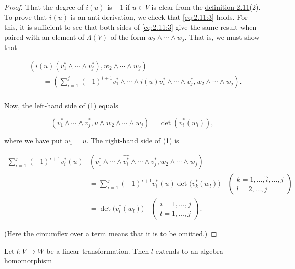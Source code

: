 \begin{proof}
That the degree of $i(u)$ is $-1$ if $u \in V$ is clear from the \hyperref[thm:2.11]{definition 2.11}(2). To prove that $i(u)$ is an anti-derivation, we check that \eqref{eq:2.11:3} holds. For this, it is sufficient to see that both sides of \eqref{eq:2.11:3} give the same result when paired with an element of $\Lambda(V)$ of the form $w_{2} \wedge \cdots \wedge w_{j}$. That is, we must show that

\begin{equation}
\tag{1}\label{eq:2.12:1}
\begin{aligned}{}&{{}\left(i(u)(v_{1}^{*}\wedge\cdots\wedge v_{j}^{*}),w_{2}\wedge\cdots\wedge w_{j}\right)}\\ {}&{{}\qquad=\left(\sum_{i=1}^{j}(-1)^{i+1}v_{1}^{*}\wedge\cdots\wedge i(u)v_{i}^{*}\wedge\cdots\wedge v_{j}^{*},w_{2}\wedge\cdots\wedge w_{j}\right).}\\ \end{aligned}
\end{equation}



Now, the left-hand side of (1) equals

\[
(v_{1}^{*}\wedge\cdots\wedge v_{j}^{*},u\wedge w_{2}\wedge\cdots\wedge w_{j})=\det(v_{i}^{*}(w_{l})),
\]

where we have put  $ w_{1}=u $. The right-hand side of (1) is


\begin{align*}\sum_{i=1}^{j}(-1)^{i+1}v_{i}^{*}(u)&(v_{1}^{*}\wedge\cdots\wedge\widehat{v_{i}^{*}}\wedge\cdots\wedge v_{j}^{*},w_{2}\wedge\cdots\wedge w_{j})\\&=\sum_{i=1}^{j}(-1)^{i+1}v_{i}^{*}(u)\det\big(v_{k}^{*}(w_{l})\big)\quad\begin{pmatrix}k=1,\ldots,\widehat{i},\ldots,j\\ l=2,\ldots,j\end{pmatrix}\\&=\det\big(v_{i}^{*}(w_{l})\big)\quad\begin{pmatrix}i=1,\ldots,j\\ l=1,\ldots,j\end{pmatrix}.\end{align*}


(Here the circumflex over a term means that it is to be omitted.)

\end{proof}

\label{thm:2.13}
Let $l: V \to W$ be a linear transformation. Then $l$ extends to an algebra homomorphism


